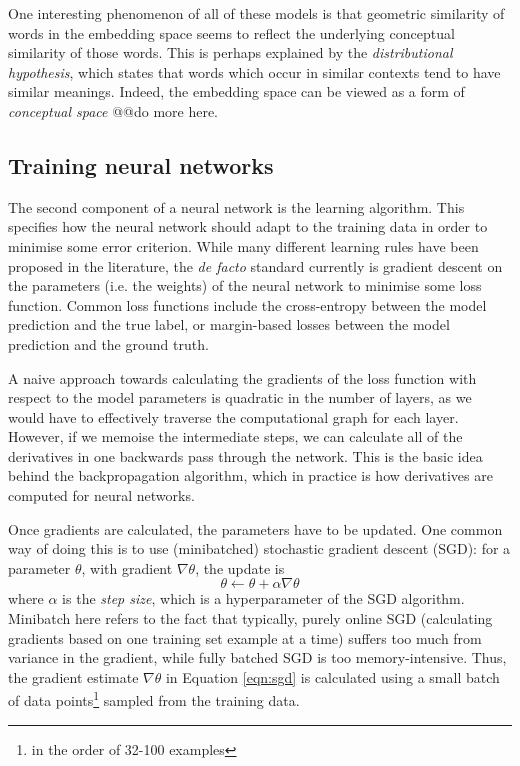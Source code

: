 One interesting phenomenon of all of these models is that geometric similarity of words in the embedding space seems to reflect the underlying conceptual similarity of those words. This is perhaps explained by the \textit{distributional hypothesis}, which states that words which occur in similar contexts tend to have similar meanings. Indeed, the embedding space can be viewed as a form of \textit{conceptual space} @@do more here.

\subsection{Training neural networks}

The second component of a neural network is the learning algorithm. This specifies how the neural network should adapt to the training data in order to minimise some error criterion. While many different learning rules have been proposed in the literature, the \textit{de facto} standard currently is gradient descent on the parameters (i.e. the weights) of the neural network to minimise some loss function. Common loss functions include the cross-entropy between the model prediction and the true label, or margin-based losses between the model prediction and the ground truth.

A naive approach towards calculating the gradients of the loss function with respect to the model parameters is quadratic in the number of layers, as we would have to effectively traverse the computational graph for each layer. However, if we memoise the intermediate steps, we can calculate all of the derivatives in one backwards pass through the network. This is the basic idea behind the backpropagation algorithm, which in practice is how derivatives are computed for neural networks. 

Once gradients are calculated, the parameters have to be updated. One common way of doing this is to use (minibatched) stochastic gradient descent (SGD): for a parameter $\theta$, with gradient $\nabla\theta$, the update is
\begin{equation}
    \theta \leftarrow \theta + \alpha \nabla \theta
    \label{eqn:sgd}
\end{equation}
where $\alpha$ is the \textit{step size}, which is a hyperparameter of the SGD algorithm. Minibatch here refers to the fact that typically, purely online SGD (calculating gradients based on one training set example at a time) suffers too much from variance in the gradient, while fully batched SGD is too memory-intensive. Thus, the gradient estimate $\nabla\theta$ in Equation \ref{eqn:sgd} is calculated using a small batch of data points\footnote{in the order of 32-100 examples} sampled from the training data.

